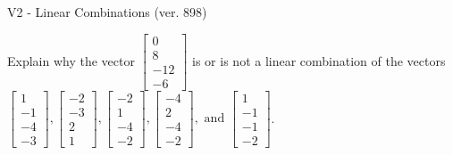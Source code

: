 \begin{exercise}
  \begin{exerciseTitle}V2 - Linear Combinations (ver. 898)\end{exerciseTitle}
  \begin{exerciseStatement}
    Explain why the vector \(\left[\begin{array}{c}
0 \\
8 \\
-12 \\
-6
\end{array}\right]\)  is or is not a linear 
	combination of the vectors \(\left[\begin{array}{c}
1 \\
-1 \\
-4 \\
-3
\end{array}\right] , \left[\begin{array}{c}
-2 \\
-3 \\
2 \\
1
\end{array}\right] , \left[\begin{array}{c}
-2 \\
1 \\
-4 \\
-2
\end{array}\right] , \left[\begin{array}{c}
-4 \\
2 \\
-4 \\
-2
\end{array}\right] , \text{ and } \left[\begin{array}{c}
1 \\
-1 \\
-1 \\
-2
\end{array}\right]\).
	



\end{exerciseStatement}
\end{exercise}
